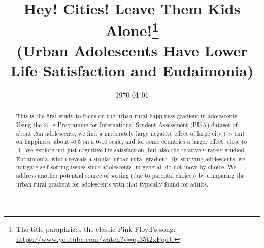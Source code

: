 \documentclass[10pt, letterpaper]{article}
\date{{}\today \hspace{.2in}\xxivtime}
\title{  %
  Hey! Cities! Leave Them Kids Alone!\footnote{The title paraphrizes the classic Pink
    Floyd's song: \url{https://www.youtube.com/watch?v=qs35t2xFqdU}} \\
  \Large{(Urban Adolescents Have Lower Life Satisfaction and Eudaimonia)} %
}
\author{
}
\begin{document}


\maketitle
\vspace{-.4in}
\begin{center}

\end{center}


\begin{abstract}
  \noindent This is the first study to focus on the urban-rural happiness gradient
  in adolescents. Using the 2018 Programme for International Student Assessment
  (PISA) dataset of about .5m adolescents, we  find a moderately large negative effect of large city ($>$1m) on
  happiness: about -0.5 on a 0-10 scale, and for some countries a larger effect, close to -1.   %
  We explore not just cognitive life satisfaction, but also the relatively rarely studied
  Eudaimonia, which reveals a similar urban-rural gradient. By studying
  adolescents, we mitigate self-sorting issues since adolescents, in general, do
  not move by choice. 
  We address another potential source of sorting (due to parental choices) by
  comparing the urban-rural gradient for adolescents with that typically found
  for adults.
\end{abstract}
\vspace{.15in} 
\vspace{.25in} 
\end{document}
